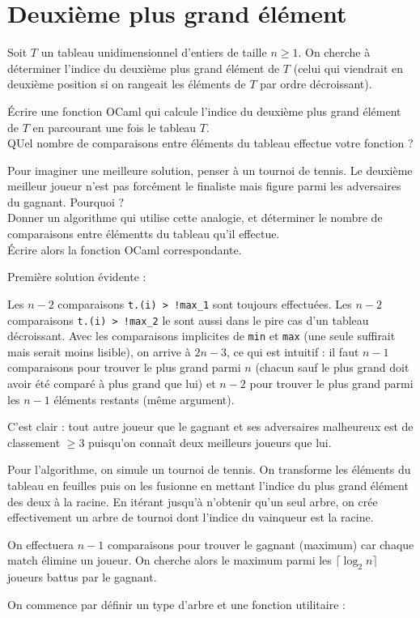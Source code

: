 \renewcommand{\SourceFile}{1-parcours-de-tableaux/src/1-4.ml}

\vspace{16pt}
\section{Deuxième plus grand élément}

Soit $T$ un tableau unidimensionnel d'entiers de taille $n\geq 1$. On cherche à déterminer l'indice du deuxième plus grand élément de $T$ (celui qui viendrait en deuxième position si on rangeait les éléments de $T$ par ordre décroissant).

\Q
Écrire une fonction OCaml qui calcule l'indice du deuxième plus grand élément de $T$ en parcourant une fois le tableau $T$.\\
QUel nombre de comparaisons entre éléments du tableau effectue votre fonction ?

\Q
Pour imaginer une meilleure solution, penser à un tournoi de tennis. Le deuxième meilleur joueur n'est pas forcément le finaliste mais figure parmi les adversaires du gagnant. Pourquoi ?\\
Donner un algorithme qui utilise cette analogie, et déterminer le nombre de comparaisons entre élémentts du tableau qu'il effectue.\\
Écrire alors la fonction OCaml correspondante.

\Corrige

\Q
Première solution évidente :



Les $n-2$ comparaisons \texttt{t.(i) > !max\_1} sont toujours effectuées. Les $n-2$ comparaisons \texttt{t.(i) > !max\_2} le sont aussi dans le pire cas d'un tableau décroissant. Avec les comparaisons implicites de \texttt{min} et \texttt{max} (une seule suffirait mais serait moins lisible), on arrive à $2n-3$, ce qui est intuitif : il faut $n-1$ comparaisons pour trouver le plus grand parmi $n$ (chacun sauf le plus grand doit avoir été comparé à plus grand que lui) et $n-2$ pour trouver le plus grand parmi les $n-1$ éléments restants (même argument).

\Q
C'est clair : tout autre joueur que le gagnant et ses adversaires malheureux est de classement $\geq 3$ puisqu'on connaît deux meilleurs joueurs que lui.
\medskip

Pour l'algorithme, on simule un tournoi de tennis. On transforme les éléments du tableau en feuilles puis on les fusionne en mettant l'indice du plus grand élément des deux à la racine. En itérant jusqu'à n'obtenir qu'un seul arbre, on crée effectivement un arbre de tournoi dont l'indice du vainqueur est la racine.
\medskip

On effectuera $n-1$ comparaisons pour trouver le gagnant (maximum) car chaque match élimine un joueur. On cherche alors le maximum parmi les $\lceil \log_2 n \rceil$ joueurs battus par le gagnant.
\medskip

On commence par définir un type d'arbre et une fonction utilitaire :





\Fin
